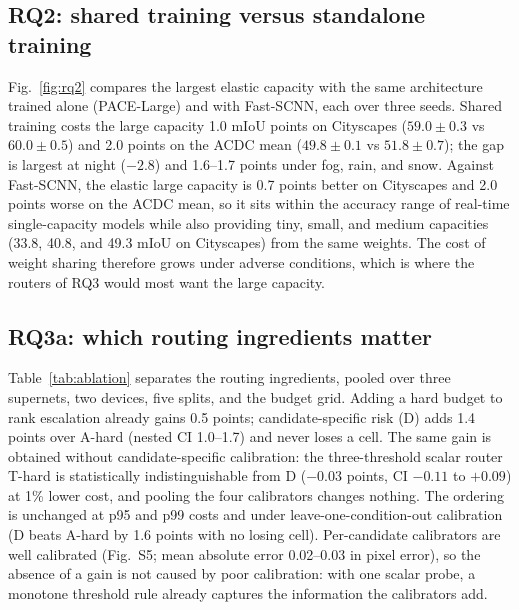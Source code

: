 \documentclass[a4paper,5p]{elsarticle}
\newcommand{\miou}{mIoU}
\begin{document}
\subsection{RQ2: shared training versus standalone training}

Fig.~\ref{fig:rq2} compares the largest elastic capacity with the same architecture trained alone (PACE-Large) and with Fast-SCNN, each over three seeds. Shared training costs the large capacity 1.0 \miou{} points on Cityscapes ($59.0\pm0.3$ vs $60.0\pm0.5$) and 2.0 points on the ACDC mean ($49.8\pm0.1$ vs $51.8\pm0.7$); the gap is largest at night ($-2.8$) and 1.6--1.7 points under fog, rain, and snow. Against Fast-SCNN, the elastic large capacity is 0.7 points better on Cityscapes and 2.0 points worse on the ACDC mean, so it sits within the accuracy range of real-time single-capacity models while also providing tiny, small, and medium capacities (33.8, 40.8, and 49.3 \miou{} on Cityscapes) from the same weights. The cost of weight sharing therefore grows under adverse conditions, which is where the routers of RQ3 would most want the large capacity.

\subsection{RQ3a: which routing ingredients matter}
\label{sec:rq3}

Table~\ref{tab:ablation} separates the routing ingredients, pooled over three supernets, two devices, five splits, and the budget grid. Adding a hard budget to rank escalation already gains 0.5 points; candidate-specific risk (D) adds 1.4 points over A-hard (nested CI 1.0--1.7) and never loses a cell. The same gain is obtained without candidate-specific calibration: the three-threshold scalar router T-hard is statistically indistinguishable from D ($-0.03$ points, CI $-0.11$ to $+0.09$) at 1\% lower cost, and pooling the four calibrators changes nothing. The ordering is unchanged at p95 and p99 costs and under leave-one-condition-out calibration (D beats A-hard by 1.6 points with no losing cell). Per-candidate calibrators are well calibrated (Fig.~S5; mean absolute error 0.02--0.03 in pixel error), so the absence of a gain is not caused by poor calibration: with one scalar probe, a monotone threshold rule already captures the information the calibrators add.
\end{document}
